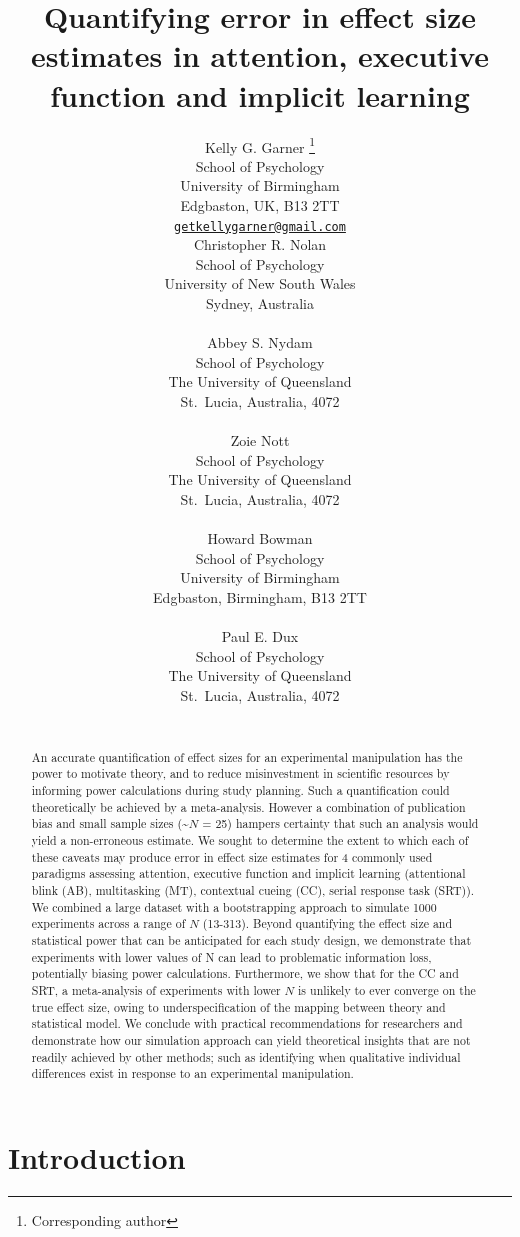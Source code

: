 \documentclass{article}
\title{Quantifying error in effect size estimates in attention, executive function and implicit learning}
\author{
    Kelly G. Garner
    \thanks{Corresponding author}
   \\
    School of Psychology \\
    University of Birmingham \\
  Edgbaston, UK, B13 2TT \\
  \texttt{\href{mailto:getkellygarner@gmail.com}{\nolinkurl{getkellygarner@gmail.com}}} \\
   \And
    Christopher R. Nolan
   \\
    School of Psychology \\
    University of New South Wales \\
  Sydney, Australia \\
  \texttt{} \\
   \And
    Abbey S. Nydam
   \\
    School of Psychology \\
    The University of Queensland \\
  St.~Lucia, Australia, 4072 \\
  \texttt{} \\
   \And
    Zoie Nott
   \\
    School of Psychology \\
    The University of Queensland \\
  St.~Lucia, Australia, 4072 \\
  \texttt{} \\
   \And
    Howard Bowman
   \\
    School of Psychology \\
    University of Birmingham \\
  Edgbaston, Birmingham, B13 2TT \\
  \texttt{} \\
   \And
    Paul E. Dux
   \\
    School of Psychology \\
    The University of Queensland \\
  St.~Lucia, Australia, 4072 \\
  \texttt{} \\
  }
\begin{document}
\maketitle


\begin{abstract}
An accurate quantification of effect sizes for an experimental manipulation has the power to motivate theory, and to reduce misinvestment in scientific resources by informing power calculations during study planning. Such a quantification could theoretically be achieved by a meta-analysis. However a combination of publication bias and small sample sizes (\textasciitilde{}\(N\) = 25) hampers certainty that such an analysis would yield a non-erroneous estimate. We sought to determine the extent to which each of these caveats may produce error in effect size estimates for 4 commonly used paradigms assessing attention, executive function and implicit learning (attentional blink (AB), multitasking (MT), contextual cueing (CC), serial response task (SRT)). We combined a large dataset with a bootstrapping approach to simulate 1000 experiments across a range of \(N\) (13-313). Beyond quantifying the effect size and statistical power that can be anticipated for each study design, we demonstrate that experiments with lower values of N can lead to problematic information loss, potentially biasing power calculations. Furthermore, we show that for the CC and SRT, a meta-analysis of experiments with lower \(N\) is unlikely to ever converge on the true effect size, owing to underspecification of the mapping between theory and statistical model. We conclude with practical recommendations for researchers and demonstrate how our simulation approach can yield theoretical insights that are not readily achieved by other methods; such as identifying when qualitative individual differences exist in response to an experimental manipulation.
\end{abstract}


\hypertarget{introduction}{%
\section{Introduction}\label{introduction}}
\end{document}
